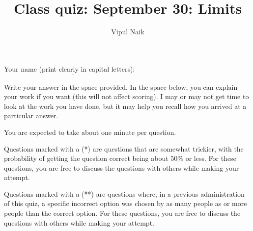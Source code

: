 \documentclass[10pt]{amsart}
\title{Class quiz: September 30: Limits}
\author{Vipul Naik}
\begin{document}
\maketitle

Your name (print clearly in capital letters): $\underline{\qquad\qquad\qquad\qquad\qquad\qquad\qquad\qquad\qquad\qquad}$

Write your answer in the space provided. In the space below, you can
explain your work if you want (this will not affect scoring). I may or
may not get time to look at the work you have done, but it may help
you recall how you arrived at a particular answer.

You are expected to take about one minute per question.

Questions marked with a (*) are questions that are somewhat trickier,
with the probability of getting the question correct being about
$50\%$ or less. For these questions, you are free to discuss the questions
with others while making your attempt.

Questions marked with a (**) are questions where, in a previous
administration of this quiz, a specific incorrect option was chosen by
as many people as or more people than the correct option. For these
questions, you are free to discuss the questions with others while
making your attempt.
\end{document}
